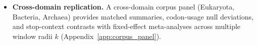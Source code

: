 \begin{itemize}
\item \textbf{Cross-domain replication.} A cross-domain corpus panel (Eukaryota, Bacteria, Archaea) provides matched summaries, codon-usage null deviations, and stop-context contrasts with fixed-effect meta-analyses across multiple window radii $k$ (Appendix~\ref{app:corpus_panel}).
\end{itemize}


